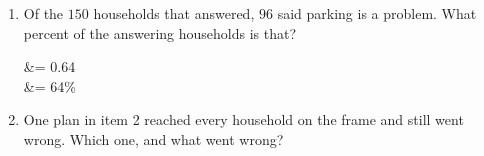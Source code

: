 \documentclass[10pt]{article}
\begin{document}
\begin{tcolorbox}[colback=white, colframe=black!40, breakable,
    title=\textbf{Tier R --- Remediate},
    fonttitle=\bfseries, arc=2mm, left=3mm, right=3mm, top=1.5mm, bottom=1.5mm]
\begin{enumerate}[leftmargin=1.6em, itemsep=4pt, topsep=3pt]
  \item Of the $150$ households that answered, $96$ said parking is a problem.
        What percent of the answering households is that?

        \begin{work}
           &= 0.64 \\
                          &= 64\%
        \end{work}

  \item One plan in item 2 reached every household on the frame and still went
        wrong. Which one, and what went wrong?
\end{enumerate}
\end{tcolorbox}

\vspace{0.06in}
\end{document}
